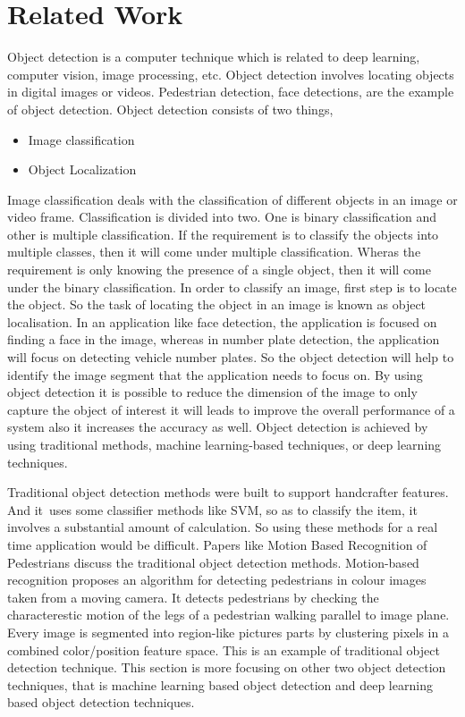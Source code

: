 \documentclass[conference]{IEEEtran}
\begin{document}
\section{Related Work}
Object detection is a computer technique which is related to deep learning, computer vision, image processing, etc. Object detection involves locating objects in digital images or videos. Pedestrian detection, face detections, are the example of object detection. Object detection consists of two things,
\begin{itemize}
	\item Image classification
	\item Object Localization
\end{itemize}
Image classification deals with the classification of different objects in an image or video frame. Classification is divided into two. One is binary classification and other is multiple classification. If the requirement is to classify the objects into multiple classes, then it will come under multiple classification. Wheras the requirement is only knowing the presence of a single object, then it will come under the binary classification. In order to classify an image, first step is to locate the object. So the task of locating the object in an image is known as object localisation. In an application like face detection, the application is focused on finding a face in the image, whereas in number plate detection, the application will focus on detecting vehicle number plates. So the object detection will help to identify the image segment that the application needs to focus on. By using object detection it is possible to reduce the dimension of the image to only capture the object of interest it will leads to improve the overall performance of a system also it increases the accuracy as well. Object detection is achieved by using traditional methods, machine learning-based techniques, or deep learning techniques. 
\par 
Traditional object detection methods were built to support handcrafter features. And it uses some classifier methods like SVM, so as to classify the item, it involves a substantial amount of calculation. So using these methods for a real time application would be difficult. Papers like Motion Based Recognition of Pedestrians \cite{1} discuss the traditional object detection methods. Motion-based recognition proposes an algorithm for detecting pedestrians in colour images taken from a moving camera. It detects pedestrians by checking the characterestic motion of the legs of a pedestrian walking parallel to image plane. Every image is segmented into region-like pictures parts by clustering pixels in a combined color/position feature space. This is an example of traditional object detection technique. This section is more focusing on other two object detection techniques, that is machine learning based object detection and deep learning based object detection techniques. 
\end{document}
